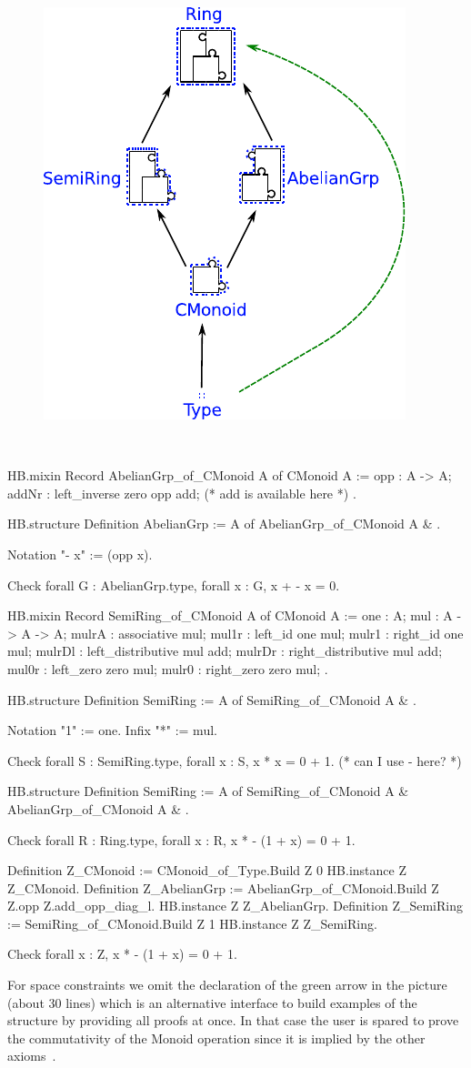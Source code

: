 \documentclass{easychair}
\begin{document}
\begin{figure}
  \includegraphics[width=.4\textwidth]{diagram.pdf}
\end{figure}
\
\begin{coqcode}
HB.mixin Record AbelianGrp_of_CMonoid A of CMonoid A := {
  opp : A -> A;
  addNr : left_inverse zero opp add; (* add is available here *)
}.

HB.structure Definition AbelianGrp :=
  { A of AbelianGrp_of_CMonoid A & }.

Notation "- x" := (opp x).

Check forall G : AbelianGrp.type, forall x : G, x + - x = 0.

HB.mixin Record SemiRing_of_CMonoid A of CMonoid A := {
  one : A;
  mul : A -> A -> A;
  mulrA : associative mul;
  mul1r : left_id one mul;
  mulr1 : right_id one mul;
  mulrDl : left_distributive mul add;
  mulrDr : right_distributive mul add;
  mul0r : left_zero zero mul;
  mulr0 : right_zero zero mul;
}.

HB.structure Definition SemiRing := { A of SemiRing_of_CMonoid A & }.

Notation "1" := one.
Infix "*" := mul.

Check forall S : SemiRing.type, forall x : S, x * x = 0 + 1. (* can I use - here? *)

HB.structure Definition SemiRing := { A of SemiRing_of_CMonoid A & AbelianGrp_of_CMonoid A & }.

Check forall R : Ring.type, forall x : R, x * - (1 + x) = 0 + 1.

Definition Z_CMonoid := CMonoid_of_Type.Build Z 0%
HB.instance Z Z_CMonoid.
Definition Z_AbelianGrp := AbelianGrp_of_CMonoid.Build Z Z.opp Z.add_opp_diag_l.
HB.instance Z Z_AbelianGrp.
Definition Z_SemiRing := SemiRing_of_CMonoid.Build Z 1%
HB.instance Z Z_SemiRing.

Check forall x : Z, x * - (1 + x) = 0 + 1.
\end{coqcode}

For space constraints we omit the declaration of the green arrow
in the picture (about 30 lines) which is an alternative interface
to build examples of the \coq{Ring} structure by providing all
proofs at once. In that case the user is spared to prove the commutativity
of the Monoid operation since it is implied by the other axioms~\cite{nearrings}.


\end{document}
